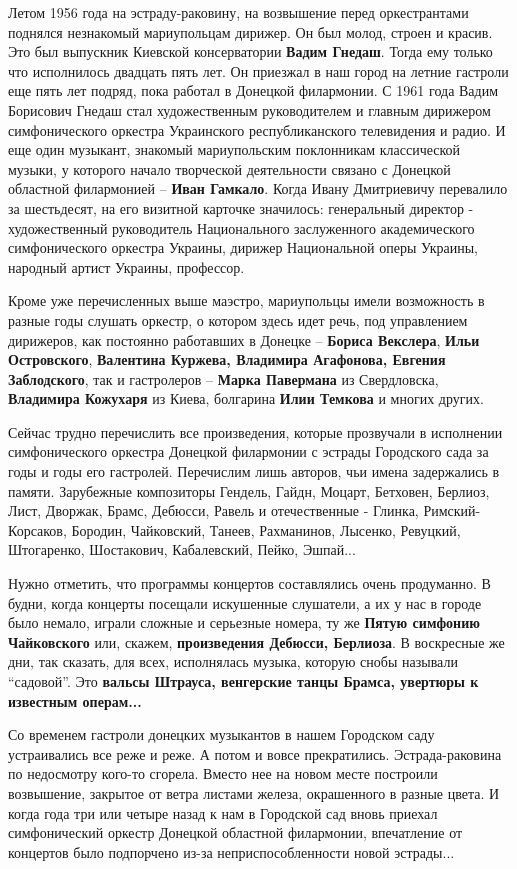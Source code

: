 Летом 1956 года на эстраду-раковину, на возвышение перед оркестрантами поднялся
незнакомый мариупольцам дирижер. Он был молод, строен и красив. Это был
выпускник Киевской консерватории \textbf{Вадим Гнедаш}. Тогда ему только что исполнилось
двадцать пять лет. Он приезжал в наш город на летние гастроли еще пять лет
подряд, пока работал в Донецкой филармонии. С 1961 года Вадим Борисович Гнедаш
стал художественным руководителем и главным дирижером симфонического оркестра
Украинского республиканского телевидения и радио. И еще один музыкант, знакомый
мариупольским поклонникам классической музыки, у которого начало творческой
деятельности связано с Донецкой областной филармонией – \textbf{Иван Гамкало}. Когда
Ивану Дмитриевичу перевалило за шестьдесят, на его визитной карточке значилось:
генеральный директор - художественный руководитель Национального заслуженного
академического симфонического оркестра Украины, дирижер Национальной оперы
Украины, народный артист Украины, профессор.

Кроме уже перечисленных выше маэстро, мариупольцы имели возможность в разные
годы слушать оркестр, о котором здесь идет речь, под управлением дирижеров, как
постоянно работавших в Донецке – \textbf{Бориса Векслера}, \textbf{Ильи Островского}, \textbf{Валентина
Куржева, Владимира Агафонова, Евгения Заблодского}, так и гастролеров – \textbf{Марка
Павермана} из Свердловска, \textbf{Владимира Кожухаря} из Киева, болгарина \textbf{Илии Темкова} и
многих других.

Сейчас трудно перечислить все произведения, которые прозвучали в исполнении
симфонического оркестра Донецкой филармонии с эстрады Городского сада за годы и
годы его гастролей. Перечислим лишь авторов, чьи имена задержались в памяти.
Зарубежные композиторы Гендель, Гайдн, Моцарт, Бетховен, Берлиоз, Лист,
Дворжак, Брамс, Дебюсси, Равель и отечественные - Глинка, Римский-Корсаков,
Бородин, Чайковский, Танеев, Рахманинов, Лысенко, Ревуцкий, Штогаренко,
Шостакович, Кабалевский, Пейко, Эшпай... 

Нужно отметить, что программы концертов составлялись очень продуманно. В будни,
когда концерты посещали искушенные слушатели, а их у нас в городе было немало,
играли сложные и серьезные номера, ту же \textbf{Пятую симфонию Чайковского} или,
скажем, \textbf{произведения Дебюсси, Берлиоза}. В воскресные же дни, так сказать, для
всех, исполнялась музыка, которую снобы называли \enquote{садовой}. Это \textbf{вальсы Штрауса,
венгерские танцы Брамса, увертюры к известным операм...}

Со временем гастроли донецких музыкантов в нашем Городском саду устраивались
все реже и реже. А потом и вовсе прекратились. Эстрада-раковина по недосмотру
кого-то сгорела. Вместо нее на новом месте построили возвышение, закрытое от
ветра листами железа, окрашенного в разные цвета. И когда года три или четыре
назад к нам в Городской сад вновь приехал симфонический оркестр Донецкой
областной филармонии, впечатление от концертов было подпорчено из-за
неприспособленности новой эстрады...

